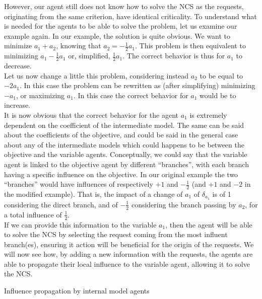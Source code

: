 However, our agent still does not know how to solve the NCS as the requests, originating from the same criterion, have identical criticality. To understand what is needed for the agents to be able to solve the problem, let us examine our example again. In our example, the solution is quite obvious. We want to minimize $a_1 + a_2$, knowing that $a_2 = -\frac{1}{2}a_1$. This problem is then equivalent to minimizing $a_1-\frac{1}{2}a_1$ or, simplified, $\frac{1}{2}a_1$. The correct behavior is thus for $a_1$ to decrease.\\
Let us now change a little this problem, considering instead $a_2$ to be equal to $ -2a_1$. In this case the problem can be rewritten as (after simplifying) minimizing $-a_1$, or maximizing $a_1$. In this case the correct behavior for $a_1$ would be to increase.\\
It is now obvious that the correct behavior for the agent $a_1$ is extremely dependent on the coefficient of the intermediate model. The same can be said about the coefficients of the objective, and could be said in the general case about any of the intermediate models which could happens to be between the objective and the variable agents. Conceptually, we could say that the variable agent is linked to the objective agent by different \enquote{branches}, with each branch having a specific influence on the objective. In our original example the two \enquote{branches} would have influences of respectively $+1$ and $-\frac{1}{2}$ (and $+1$ and $-2$ in the modified example). That is, the impact of a change of $a_1$ of $\delta_{a_1}$ is of 1 considering the direct branch, and of $-\frac{1}{2}$ considering the branch passing by $a_2$, for a total influence of $\frac{1}{2}$.\\
If we can provide this information to the variable $a_1$, then the agent will be able to solve the NCS by selecting the request coming from the most influent branch(es), ensuring it action will be beneficial for the origin of the requests. We will now see how, by adding a new information with the requests, the agents are able to propagate their local influence to the variable agent, allowing it to solve the NCS.

\begin{algorithm}
\caption{Influence propagation by internal model agents}
\label{algo_hidden_dependency_influence_propagation}

	

\end{algorithm}

